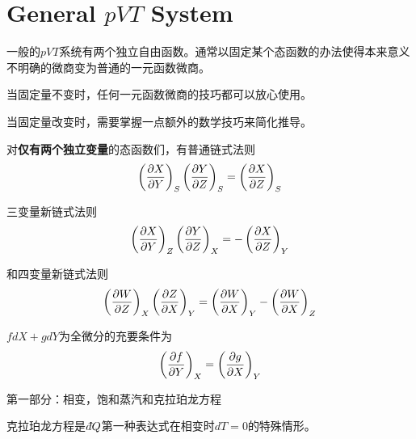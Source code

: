 \documentclass[CJK]{beamer}
\begin{document}
\section{General $pVT$ System}
\setcounter{chap}{2}
\setcounter{problem}{0}

\begin{frame}
  \bch
  \bitem
  \item{一般的$pVT$系统有两个独立自由函数。通常以固定某个态函数的办法使得本来意义不明确的微商变为普通的一元函数微商。}
  \item{  当固定量不变时，任何一元函数微商的技巧都可以放心使用。}
  \item{
    当固定量改变时，需要掌握一点额外的数学技巧来简化推导。}
    \eitem
  
  \ech
\end{frame}

\begin{frame}
  \bch
  对{\bf 仅有两个独立变量}的态函数们，有普通链式法则
  $$\left(\frac{\partial X}{\partial Y}\right)_{S} \left(\frac{\partial Y}{\partial Z}\right)_{S} = \left(\frac{\partial X}{\partial Z}\right)_{S}$$

  三变量新链式法则
  $$\left(\frac{\partial X}{\partial Y}\right)_{Z} \left(\frac{\partial Y}{\partial Z}\right)_{X} = -\left(\frac{\partial X}{\partial Z}\right)_{Y}$$

  和四变量新链式法则
  $$ \left(\frac{\partial W}{\partial Z}\right)_{X} \left(\frac{\partial Z}{\partial X}\right)_{Y} = \left(\frac{\partial W}{\partial X}\right)_{Y} - \left(\frac{\partial W}{\partial X}\right)_{Z}  $$
  
  \ech
\end{frame}


\begin{frame}
  \bch
  $ f dX + g dY$为全微分的充要条件为
  $$\left(\frac{\partial f}{\partial Y}\right)_{X} = \left(\frac{\partial g}{\partial X}\right)_{Y} $$
  
  \ech
\end{frame}


\begin{frame}
  \bch
  {
  \small
  }
  \ech
\end{frame}

\begin{frame}
  \bch
  {\Huge 第一部分：相变，饱和蒸汽和克拉珀龙方程}
  \ech
\end{frame}


\begin{frame}
  \bch
  \emini
  克拉珀龙方程是$\dbar Q$第一种表达式在相变时$dT=0$的特殊情形。
  \emini
  
  \ech
\end{frame}
\end{document}
